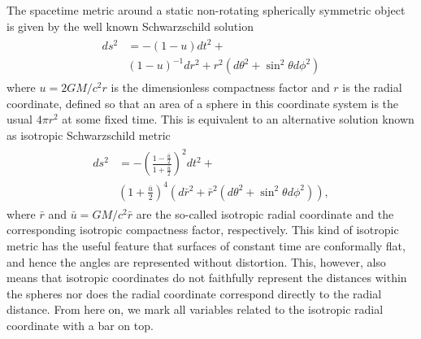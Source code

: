 \documentclass[iop, usenatbib]{emulateapj}
\newcommand{\sch}{Schwarzschild }
\newcommand{\rb}{\ensuremath{\bar{r}}}
\renewcommand{\ub}{\ensuremath{\bar{u}}}
\begin{document}
The spacetime metric around a static non-rotating spherically symmetric object is given by the well known \sch solution
\begin{align}\begin{split}
ds^2 & = -(1-u)dt^2 + \\
     & (1-u)^{-1}dr^2+r^2(d\theta^2+\sin^2\theta d\phi^2)
\end{split}\end{align}
where $u = 2GM/c^2 r$ is the dimensionless compactness factor and $r$ is
the radial coordinate, defined so that an area of a sphere in this coordinate system is the usual $4\pi r^2$ at some fixed time.
This is equivalent to an alternative solution known as isotropic \sch metric \citep[see e.g.][]{MTW73}
\begin{align}\begin{split}
\label{eq:ISch}
ds^2 & = -\left( \frac{1-\frac{\ub}{2}}{1+\frac{\ub}{2}} \right)^2 dt^2 + \\
     & (1+\frac{\ub}{2})^4(d\rb^2 + \rb^2(d\theta^2+\sin^2\theta d\phi^2)),
\end{split}\end{align}
where  $\rb$ and $\ub=GM/c^2\rb$ are the so-called isotropic radial
coordinate and the corresponding isotropic compactness factor,
respectively. 
This kind of isotropic metric has the useful feature that surfaces of constant time are conformally flat, and hence the angles are represented without distortion.
This, however, also means that isotropic coordinates do not faithfully represent the distances within the spheres nor does the radial coordinate correspond directly to the radial distance.
From here on, we mark all variables related to the isotropic radial coordinate with a bar on top.
\end{document}
